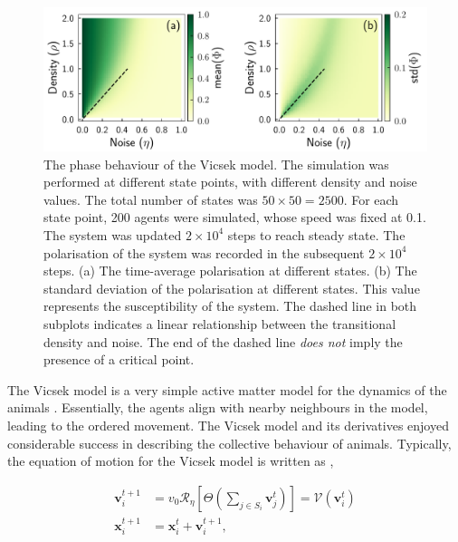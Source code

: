 \documentclass[11pt,twoside]{report}
\begin{document}
\begin{figure}
  \includegraphics[width=\linewidth]{phase-vicsek}
  \caption[The phase behaviour of the Vicsek model]{
  The phase behaviour of the Vicsek model. The simulation was performed at different state points, with different density and noise values. The total number of states was $50 \times 50 = 2500$. For each state point, 200 agents were simulated, whose speed was fixed at 0.1. The system was updated $2\times10^4$ steps to reach steady state. The polarisation of the system was recorded in the subsequent $2\times10^4$ steps.
  (a) The time-average polarisation at different states.
  (b) The standard deviation of the polarisation at different states. This value represents the susceptibility of the system.
  The dashed line in both subplots indicates a linear relationship between the transitional density and noise. The end of the dashed line \emph{does not} imply the presence of a critical point.
  }
  \label{fig:phase-vicsek}
\end{figure}


The Vicsek model is a very simple active matter model for the dynamics of the animals \cite{vicsek1995}. Essentially, the agents align with nearby neighbours in the model, leading to the ordered movement.
The Vicsek model and its derivatives enjoyed considerable success in describing the collective behaviour of animals. Typically, the equation of motion for the Vicsek model is written as \cite{vicsek1995},

\begin{equation}
\begin{split}
	\mathbf{v}_{i}^{t+1}
	&=
    v_{0} \mathcal{R}_{\eta} \left[\Theta\left(
            \sum_{j \in S_{i}} \mathbf{v}_{j}^t
    \right)\right]
    = \mathcal{V} (\mathbf{v}_{i}^t) \\
	\mathbf{x}_i^{t+1}
	&= \mathbf{x}_i^{t} + \mathbf{v}_i^{t+1},
\end{split}
\label{eq:vicsek}
\end{equation}
\end{document}
